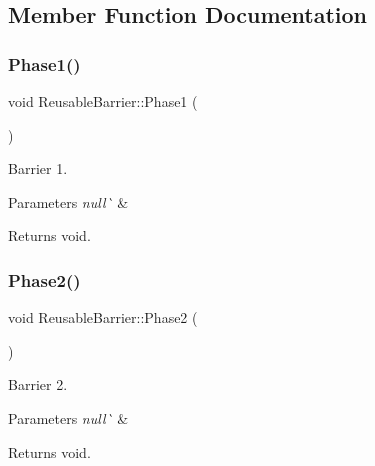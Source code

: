 \subsection{Member Function Documentation}
\mbox{\label{class_reusable_barrier_a9335a815242eff0807f91b63416d4e56}} 
\subsubsection{\texorpdfstring{Phase1()}{Phase1()}}
{\footnotesize\ttfamily void Reusable\+Barrier\+::\+Phase1 (\begin{DoxyParamCaption}{ }\end{DoxyParamCaption})}



Barrier 1. 


\begin{DoxyParams}{Parameters}
{\em null\`{}} & \\
\hline
\end{DoxyParams}
\begin{DoxyReturn}{Returns}
void. 
\end{DoxyReturn}
\mbox{\label{class_reusable_barrier_a32b1701adeedd4d968118a152cd3f47d}} 
\subsubsection{\texorpdfstring{Phase2()}{Phase2()}}
{\footnotesize\ttfamily void Reusable\+Barrier\+::\+Phase2 (\begin{DoxyParamCaption}{ }\end{DoxyParamCaption})}



Barrier 2. 


\begin{DoxyParams}{Parameters}
{\em null\`{}} & \\
\hline
\end{DoxyParams}
\begin{DoxyReturn}{Returns}
void. 
\end{DoxyReturn}
\mbox{\label{class_reusable_barrier_ad3545683b5538142ca6377c3a95552f2}} 
